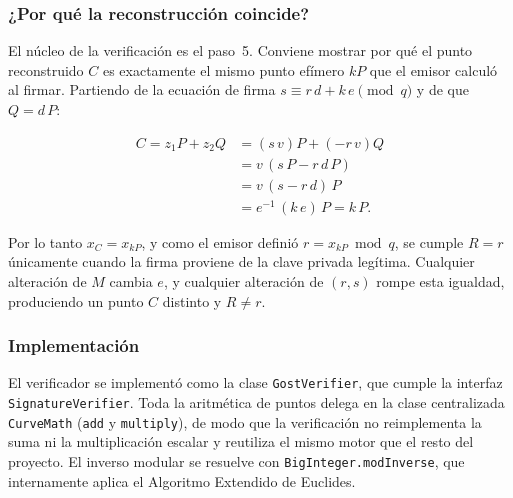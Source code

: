 \subsubsection{¿Por qué la reconstrucción coincide?}

El núcleo de la verificación es el paso~5. Conviene mostrar por qué el punto reconstruido $C$ es exactamente el mismo punto efímero $kP$ que el emisor calculó al firmar. Partiendo de la ecuación de firma $s \equiv r\,d + k\,e \pmod q$ y de que $Q = d\,P$:

$$
\begin{aligned}
C = z_1 P + z_2 Q
  &= (s\,v)P + (-r\,v)Q \\
  &= v\,(s\,P - r\,d\,P) \\
  &= v\,(s - r\,d)\,P \\
  &= e^{-1}\,(k\,e)\,P = k\,P.
\end{aligned}
$$

Por lo tanto $x_C = x_{kP}$, y como el emisor definió $r = x_{kP} \bmod q$, se cumple $R = r$ únicamente cuando la firma proviene de la clave privada legítima. Cualquier alteración de $M$ cambia $e$, y cualquier alteración de $(r,s)$ rompe esta igualdad, produciendo un punto $C$ distinto y $R \neq r$.

\subsubsection{Implementación}

El verificador se implementó como la clase \texttt{GostVerifier}, que cumple la interfaz \texttt{SignatureVerifier}. Toda la aritmética de puntos delega en la clase centralizada \texttt{CurveMath} (\texttt{add} y \texttt{multiply}), de modo que la verificación no reimplementa la suma ni la multiplicación escalar y reutiliza el mismo motor que el resto del proyecto. El inverso modular se resuelve con \texttt{BigInteger.modInverse}, que internamente aplica el Algoritmo Extendido de Euclides.

